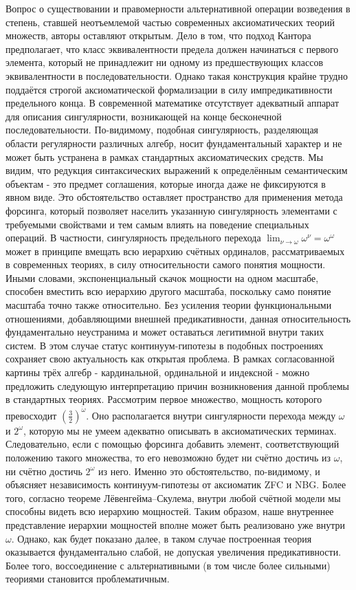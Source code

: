 \documentclass[12pt]{article}
\begin{document}
Вопрос о существовании и правомерности альтернативной операции возведения в степень, ставшей неотъемлемой частью современных аксиоматических теорий множеств, авторы оставляют открытым. Дело в том, что подход Кантора предполагает, что класс эквивалентности предела должен начинаться с первого элемента, который не принадлежит ни одному из предшествующих классов эквивалентности в последовательности. Однако такая конструкция крайне трудно поддаётся строгой аксиоматической формализации в силу импредикативности предельного конца. В современной математике отсутствует адекватный аппарат для описания сингулярности, возникающей на конце бесконечной последовательности. По-видимому, подобная сингулярность, разделяющая области регулярности различных алгебр, носит фундаментальный характер и не может быть устранена в рамках стандартных аксиоматических средств. Мы видим, что редукция синтаксических выражений к определённым семантическим объектам - это предмет соглашения, которые иногда даже не фиксируются в явном виде. Это обстоятельство оставляет пространство для применения метода форсинга, который позволяет населить указанную сингулярность элементами с требуемыми свойствами и тем самым влиять на поведение специальных операций. В частности, сингулярность предельного перехода $\lim_{\nu \to \omega} \omega^\nu = \omega^\omega$ может в принципе вмещать всю иерархию счётных ординалов, рассматриваемых в современных теориях, в силу относительности самого понятия мощности. Иными словами, экспоненциальный скачок мощности на одном масштабе, способен вместить всю иерархию другого масштаба, поскольку само понятие масштаба точно также относительно. Без усиления теории функциональными отношениями, добавляющими внешней предикативности, данная относительность фундаментально неустранима и может оставаться легитимной внутри таких систем. В этом случае статус континуум-гипотезы в подобных построениях сохраняет свою актуальность как открытая проблема. В рамках согласованной картины трёх алгебр - кардинальной, ординальной и индексной - можно предложить следующую интерпретацию причин возникновения данной проблемы в стандартных теориях. Рассмотрим первое множество, мощность которого превосходит $(\frac{3}{2})^{\dot{\omega}}$. Оно располагается внутри сингулярности перехода между $\omega$ и $2^\omega$, которую мы не умеем адекватно описывать в аксиоматических терминах. Следовательно, если с помощью форсинга добавить элемент, соответствующий положению такого множества, то его невозможно будет ни счётно достичь из $\omega$, ни счётно достичь $2^\omega$ из него. Именно это обстоятельство, по-видимому, и объясняет независимость континуум-гипотезы от аксиоматик ZFC и NBG. Более того, согласно теореме Лёвенгейма–Скулема, внутри любой счётной модели мы способны видеть всю иерархию мощностей. Таким образом, наше внутреннее представление иерархии мощностей вполне может быть реализовано уже внутри $\omega$. Однако, как будет показано далее, в таком случае построенная теория оказывается фундаментально слабой, не допуская увеличения предикативности. Более того, воссоединение с альтернативными (в том числе более сильными) теориями становится проблематичным.
\end{document}
